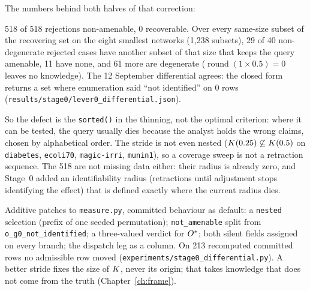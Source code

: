 The numbers behind both halves of that correction:

\begin{medido}
518 of 518 rejections non-amenable, 0 recoverable. Over every same-size subset of the recovering set on the eight smallest
networks (1,238 subsets), 29 of 40 non-degenerate rejected cases have another subset of that size that keeps the query
amenable, 11 have none, and 61 more are degenerate ($\operatorname{round}(1 \times 0.5) = 0$ leaves no knowledge). The 12
September differential agrees: the closed form returns a set where enumeration said ``not identified'' on 0 rows
(\texttt{results/stage0/lever0\_differential.json}).
\end{medido}

So the defect is the \texttt{sorted()} in the thinning, not the optimal criterion: where it can be tested, the query usually
dies because the analyst holds the wrong claims, chosen by alphabetical order. The stride is not even nested ($K(0.25)
\not\subseteq K(0.5)$ on \texttt{diabetes}, \texttt{ecoli70}, \texttt{magic-irri}, \texttt{munin1}), so a coverage sweep is not
a retraction sequence. The 518 are not missing data either: their radius is already zero, and Stage~0 added an identifiability radius (retractions until
adjustment stops identifying the effect) that is defined exactly where the current radius dies.

\begin{noprato}
Additive patches to \texttt{measure.py}, committed behaviour as default: a \texttt{nested} selection (prefix of one seeded
permutation); \texttt{not\_amenable} split from \texttt{o\_g0\_not\_identified}; a three-valued verdict for $O^{*}$; both silent
fields assigned on every branch; the dispatch leg as a column. On 213 recomputed committed rows no admissible row moved
(\texttt{experiments/stage0\_differential.py}). A better stride fixes the size of $K$, never its origin; that takes knowledge
that does not come from the truth (Chapter~\ref{ch:frame}).
\end{noprato}


